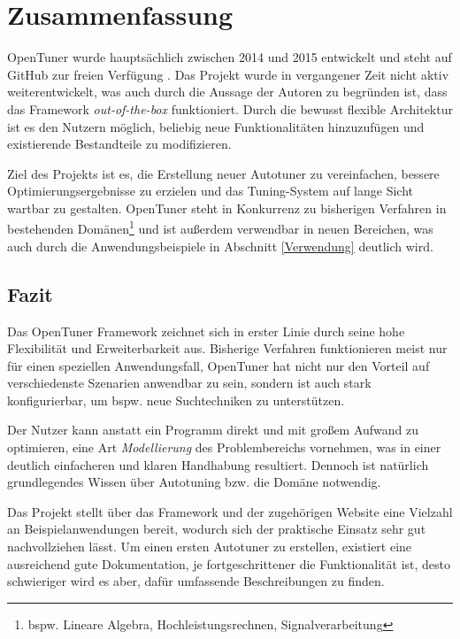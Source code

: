 \documentclass[a4paper,11pt]{scrartcl}
\newcommand{\bspw}{\mbox{bspw.}\xspace}
\newcommand{\bzw}{\mbox{bzw.}\xspace}
\begin{document}

\section{Zusammenfassung}
OpenTuner wurde hauptsächlich zwischen 2014 und 2015 entwickelt und steht auf GitHub 
zur freien Verfügung \cite{ghub}. Das Projekt wurde in vergangener Zeit nicht aktiv
weiterentwickelt, was auch durch die Aussage der Autoren zu begründen ist, dass das
Framework \emph{out-of-the-box} funktioniert. Durch die bewusst flexible Architektur
ist es den Nutzern möglich, beliebig neue Funktionalitäten hinzuzufügen und
existierende Bestandteile zu modifizieren. \newline

Ziel des Projekts ist es, die Erstellung neuer Autotuner zu vereinfachen, bessere
Optimierungsergebnisse zu erzielen und das Tuning-System auf lange Sicht wartbar
zu gestalten. OpenTuner steht in Konkurrenz zu bisherigen Verfahren in 
bestehenden Domänen\footnote{\bspw Lineare Algebra, Hochleistungsrechnen, Signalverarbeitung}
und ist außerdem verwendbar in neuen Bereichen, was auch durch die Anwendungsbeispiele in 
Abschnitt \ref{Verwendung} deutlich wird.

\subsection{Fazit}
Das OpenTuner Framework zeichnet sich in erster Linie durch seine hohe Flexibilität
und Erweiterbarkeit aus. Bisherige Verfahren funktionieren meist nur für einen speziellen
Anwendungsfall, OpenTuner hat nicht nur den Vorteil auf verschiedenste Szenarien anwendbar zu sein,
sondern ist auch stark konfigurierbar, um \bspw neue Suchtechniken zu unterstützen. \newline

Der Nutzer kann anstatt ein Programm direkt und mit großem Aufwand zu optimieren,
eine Art \emph{Modellierung} des Problembereichs vornehmen, was in einer deutlich
einfacheren und klaren Handhabung resultiert. Dennoch ist natürlich grundlegendes
Wissen über Autotuning \bzw die Domäne notwendig. \newline

Das Projekt stellt über das Framework und der zugehörigen Website \cite{ot} eine
Vielzahl an Beispielanwendungen bereit, wodurch sich der praktische Einsatz sehr
gut nachvollziehen lässt. Um einen ersten Autotuner zu erstellen, existiert eine
ausreichend gute Dokumentation, je fortgeschrittener die Funktionalität ist,
desto schwieriger wird es aber, dafür umfassende Beschreibungen zu finden. \newline
\end{document}
